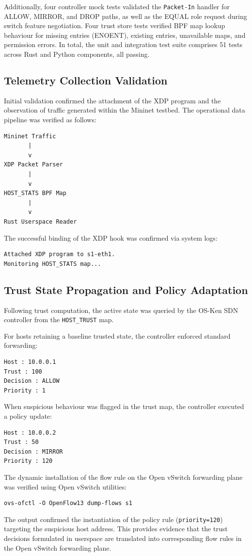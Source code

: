 \documentclass[conference]{IEEEtran}
\begin{document}
Additionally, four controller mock tests validated the \texttt{Packet-In} handler for ALLOW, MIRROR, and DROP paths, as well as the EQUAL role request during switch feature negotiation. Four trust store tests verified BPF map lookup behaviour for missing entries (ENOENT), existing entries, unavailable maps, and permission errors. In total, the unit and integration test suite comprises 51 tests across Rust and Python components, all passing.

\subsection{Telemetry Collection Validation}
Initial validation confirmed the attachment of the XDP program and the observation of traffic generated within the Mininet testbed. The operational data pipeline was verified as follows:
\begin{verbatim}
Mininet Traffic
       |
       v
XDP Packet Parser
       |
       v
HOST_STATS BPF Map
       |
       v
Rust Userspace Reader
\end{verbatim}

The successful binding of the XDP hook was confirmed via system logs:
\begin{verbatim}
Attached XDP program to s1-eth1.
Monitoring HOST_STATS map...
\end{verbatim}

\subsection{Trust State Propagation and Policy Adaptation}
Following trust computation, the active state was queried by the OS-Ken SDN controller from the \texttt{HOST\_TRUST} map.

For hosts retaining a baseline trusted state, the controller enforced standard forwarding:
\begin{verbatim}
Host : 10.0.0.1
Trust : 100
Decision : ALLOW
Priority : 1
\end{verbatim}

When suspicious behaviour was flagged in the trust map, the controller executed a policy update:
\begin{verbatim}
Host : 10.0.0.2
Trust : 50
Decision : MIRROR
Priority : 120
\end{verbatim}

The dynamic installation of the flow rule on the Open vSwitch forwarding plane was verified using Open vSwitch utilities:
\begin{verbatim}
ovs-ofctl -O OpenFlow13 dump-flows s1
\end{verbatim}
The output confirmed the instantiation of the policy rule (\texttt{priority=120}) targeting the suspicious host address. This provides evidence that the trust decisions formulated in userspace are translated into corresponding flow rules in the Open vSwitch forwarding plane.
\end{document}

